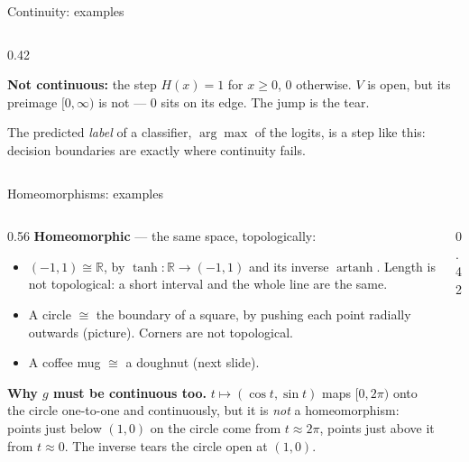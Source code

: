 \documentclass[10pt,aspectratio=169]{beamer}
\newcommand{\R}{\mathbb{R}}
\begin{document}
\begin{frame}[shrink=3]{Continuity: examples}
\begin{columns}[T,onlytextwidth]
\begin{column}{0.42\textwidth}
                \vspace{0.3em}
                \footnotesize\raggedright
                \textbf{Not continuous:} the step $H(x)=1$ for $x\ge0$, $0$ otherwise.
                $V$ is open, but its preimage $[0,\infty)$ is not --- $0$ sits on its edge.
                The jump is the tear.

                \vspace{0.3em}
                The predicted \emph{label} of a classifier, $\arg\max$ of the logits, is a
                step like this: decision boundaries are exactly where continuity fails.
            \end{column}
        \end{columns}
    \end{frame}

    \begin{frame}{Homeomorphisms: examples}
        \begin{columns}[T,onlytextwidth]
            \begin{column}{0.56\textwidth}
                \small
                \textbf{Homeomorphic} --- the same space, topologically:
                \begin{itemize}
                    \item $(-1,1)\cong\R$, by $\tanh:\R\to(-1,1)$ and its inverse
                    $\operatorname{artanh}$. Length is not topological: a short interval and
                    the whole line are the same.
                    \item A circle $\cong$ the boundary of a square, by pushing each point
                    radially outwards (picture). Corners are not topological.
                    \item A coffee mug $\cong$ a doughnut (next slide).
                \end{itemize}

                \vspace{0.4em}
                \textbf{Why $g$ must be continuous too.} $t\mapsto(\cos t,\sin t)$ maps
                $[0,2\pi)$ onto the circle one-to-one and continuously, but it is
                \emph{not} a homeomorphism: points just below $(1,0)$ on the circle come
                from $t\approx2\pi$, points just above it from $t\approx0$. The inverse
                tears the circle open at $(1,0)$.
            \end{column}
            \begin{column}{0.42\textwidth}
                \centering


\end{column}
\end{columns}
\end{frame}
\end{document}

